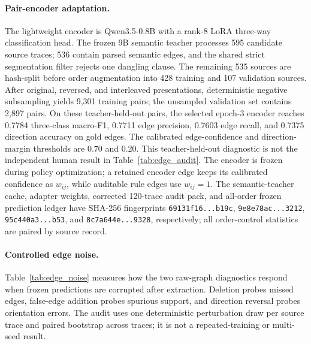 \paragraph{Pair-encoder adaptation.}
The lightweight encoder is Qwen3.5-0.8B with a rank-8 LoRA three-way classification head. The frozen 9B semantic teacher processes 595 candidate source traces; 536 contain parsed semantic edges, and the shared strict segmentation filter rejects one dangling clause. The remaining 535 sources are hash-split before order augmentation into 428 training and 107 validation sources. After original, reversed, and interleaved presentations, deterministic negative subsampling yields 9,301 training pairs; the unsampled validation set contains 2,897 pairs. On these teacher-held-out pairs, the selected epoch-3 encoder reaches 0.7784 three-class macro-F1, 0.7711 edge precision, 0.7603 edge recall, and 0.7375 direction accuracy on gold edges. The calibrated edge-confidence and direction-margin thresholds are 0.70 and 0.20. This teacher-held-out diagnostic is not the independent human result in Table~\ref{tab:edge_audit}. The encoder is frozen during policy optimization; a retained encoder edge keeps its calibrated confidence as $w_{ij}$, while auditable rule edges use $w_{ij}=1$. The semantic-teacher cache, adapter weights, corrected 120-trace audit pack, and all-order frozen prediction ledger have SHA-256 fingerprints \texttt{69131f16...b19c}, \texttt{9e8e78ac...3212}, \texttt{95c440a3...b53}, and \texttt{8c7a644e...9328}, respectively; all order-control statistics are paired by source record.

\paragraph{Controlled edge noise.}
Table~\ref{tab:edge_noise} measures how the two raw-graph diagnostics respond when frozen predictions are corrupted after extraction. Deletion probes missed edges, false-edge addition probes spurious support, and direction reversal probes orientation errors. The audit uses one deterministic perturbation draw per source trace and paired bootstrap across traces; it is not a repeated-training or multi-seed result.

